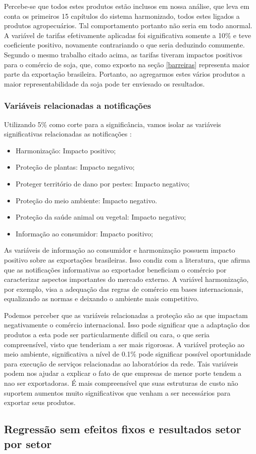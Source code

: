 \documentclass[12pt, a4paper]{article}
\begin{document}
Percebe-se que todos estes produtos estão inclusos em nossa análise, que leva em conta os primeiros 15 capítulos do sistema harmonizado, todos estes ligados a produtos agropecuários. Tal comportamento portanto não seria em todo anormal. A variável de tarifas efetivamente aplicadas foi significativa somente a 10\% e teve coeficiente positivo, novamente contrariando o que seria deduzindo comumente. Segundo o mesmo trabalho citado acima, as tarifas tiveram impactos positivos para o comércio de soja, que, como exposto na seção \ref{barreiras} representa maior parte da exportação brasileira. Portanto, ao agregarmos estes vários produtos a maior representabilidade da soja pode ter enviesado os resultados. 

\subsubsection{Variáveis relacionadas a notificações}

 Utilizando 5\% como corte para a significância, vamos isolar as variáveis significativas relacionadas as notificações :

 \begin{itemize}
         \item Harmonização: Impacto positivo;
         \item Proteção de plantas: Impacto negativo;
         \item Proteger território de dano por pestes: Impacto negativo;
         \item Proteção do meio ambiente: Impacto negativo.
         \item Proteção da saúde animal ou vegetal: Impacto negativo;
         \item Informação ao consumidor: Impacto positivo;
 \end{itemize}

 As variáveis de informação ao consumidor e harmonização possuem impacto positivo sobre as exportações brasileiras. Isso condiz com a literatura, que afirma que as notificações informativas ao exportador beneficiam o comércio por caracterizar aspectos importantes do mercado externo. A variável harmonização, por exemplo, visa a adequação das regras de comércio em bases internacionais, equalizando as normas e deixando o ambiente mais competitivo.

Podemos perceber que as variáveis relacionadas a proteção são as que impactam negativamente o comércio internacional. Isso pode significar que a adaptação dos produtos a esta pode ser particularmente difícil ou cara, o que seria compreensível, visto que tenderiam a ser mais rigorosas. A variável proteção ao meio ambiente, significativa a nível de 0.1\% pode significar possível oportunidade para execução de serviços relacionadas ao laboratórios da rede. Tais variáveis podem nos ajudar a explicar o fato de que empresas de menor porte tendem a nao ser exportadoras. É mais compreensível que suas estruturas de custo não suportem aumentos muito significativos que venham a ser necessários para exportar seus produtos.

\newpage

\subsection{Regressão sem efeitos fixos e resultados setor por setor}





\printbibliography
\end{document}

